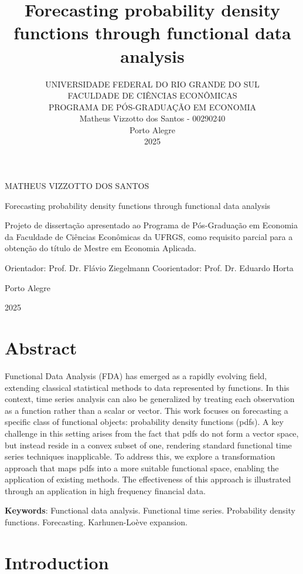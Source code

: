 \documentclass[article]{abntex2}
\title{Forecasting probability density functions through functional data analysis}
\author{UNIVERSIDADE FEDERAL DO RIO GRANDE DO SUL\\ FACULDADE DE CIÊNCIAS ECONÔMICAS \\ PROGRAMA DE PÓS-GRADUAÇÃO EM ECONOMIA \\ Matheus Vizzotto dos Santos - 00290240 \\ Porto Alegre \\ 2025}
\begin{document}
\pagestyle{headings}

\maketitle

\newpage
\newpage
MATHEUS VIZZOTTO DOS SANTOS

Forecasting probability density functions through functional data analysis

Projeto de dissertação apresentado ao Programa de Pós-Graduação em Economia da Faculdade de Ciências Econômicas da UFRGS, como requisito parcial para a obtenção do título de Mestre em Economia Aplicada.

Orientador: Prof. Dr. Flávio Ziegelmann
Coorientador: Prof. Dr. Eduardo Horta

Porto Alegre

2025

\newpage

\section{Abstract}

Functional Data Analysis (FDA) has emerged as a rapidly evolving field, extending classical statistical methods to data represented by functions. In this context, time series analysis can also be generalized by treating each observation as a function rather than a scalar or vector. This work focuses on forecasting a specific class of functional objects: probability density functions (pdfs). A key challenge in this setting arises from the fact that pdfs do not form a vector space, but instead reside in a convex subset of one, rendering standard functional time series techniques inapplicable. To address this, we explore a transformation approach that maps pdfs into a more suitable functional space, enabling the application of existing methods. The effectiveness of this approach is illustrated through an application in high frequency financial data.


\textbf{Keywords}: Functional data analysis. Functional time series. Probability density functions. Forecasting. Karhunen-Loève expansion. 

\newpage

\tableofcontents


\newpage

\section{Introduction}
\end{document}
